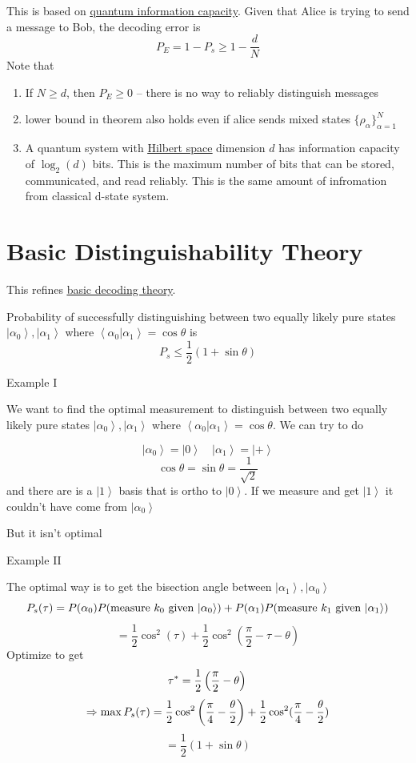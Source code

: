 \documentclass[
]{article}
\let\oldhyperref\hyperref
\renewcommand{\hyperref}[2][]{\oldhyperref[#1]{\underline{#2}}}
\providecommand{\ket}[1]{\left\lvert #1 \right\rangle}
\providecommand{\braket}[1]{\left\langle #1 \right\rangle}
\providecommand{\Rarr}{\Rightarrow}
\begin{document}
This is based on \hyperref[quantum-information-capacity]{quantum information capacity}.
Given that Alice is trying to send a message to Bob, the decoding error is
\[
	P_E=1-P_s\geq 1-\frac{d}{N}
\]
Note that
\begin{enumerate}
	\item If \(N\geq d\), then \(P_E\geq 0\) -- there is no way to reliably distinguish messages
	\item lower bound in theorem also holds even if alice sends mixed states \(\{\rho_\alpha\}_{\alpha=1}^N\)
	\item A quantum system with \hyperref[hilbert-spaces]{Hilbert space} dimension \(d\) has information capacity of \(\log_2(d)\) bits. This is the maximum number of bits that can be stored, communicated, and read reliably. This is the same amount of infromation from classical d-state system.
\end{enumerate}

\section{Basic Distinguishability Theory}\label{basic-distinguishability-theory}

This refines \hyperref[basic-decoding-theory]{basic decoding theory}.

Probability of successfully distinguishing between two equally likely pure states \(\ket{\alpha_0}, \ket{\alpha_1}\) where \(\braket{\alpha_0|\alpha_1}=\cos\theta\) is
\[
	P_s\leq \frac{1}{2}(1+\sin\theta)
\]

Example I

We want to find the optimal measurement to distinguish between two equally likely pure states \(\ket{\alpha_0}, \ket{\alpha_1}\) where \(\braket{\alpha_0|\alpha_1}=\cos\theta\).
We can try to do

\[
	\ket{\alpha_0}=\ket{0}\quad\ket{\alpha_1}=\ket{+}
\]
\[
	\cos\theta =\sin\theta=\frac{1}{\sqrt{2}}
\]
and there are is a $\ket{1}$ basis that is ortho to $\ket{0}$. If we measure and get $\ket{1}$ it couldn’t have come from $\ket{\alpha_0}$

But it isn't optimal

Example II

The optimal way is to get the bisection angle between $\ket{\alpha_1},\ket{\alpha_0}$
\[
	P_s(\tau)=P(\alpha_0)P(\text{measure $k_0$ given $\ket{\alpha_0}$})+P(\alpha_1)P(\text{measure $k_1$ given $\ket{\alpha_1}$})\\
\]
\[
	=\frac{1}{2}\cos^2(\tau)+\frac{1}{2}\cos^2(\frac{\pi}{2}-\tau-\theta)
\]
Optimize to get
\[
	\tau^*=\frac{1}{2}\left(\frac{\pi}{2}-\theta\right)\\
\]
\[
	\Rarr \max P_s(\tau)=\frac{1}{2}\cos^2\left(\frac{\pi}{4}-\frac{\theta}{2}\right)+\frac{1}{2}\cos^2(\frac{\pi}{4}-\frac{\theta}{2})\\
\]
\[
	=\frac{1}{2}\left(1+\sin\theta\right)
\]
\end{document}
